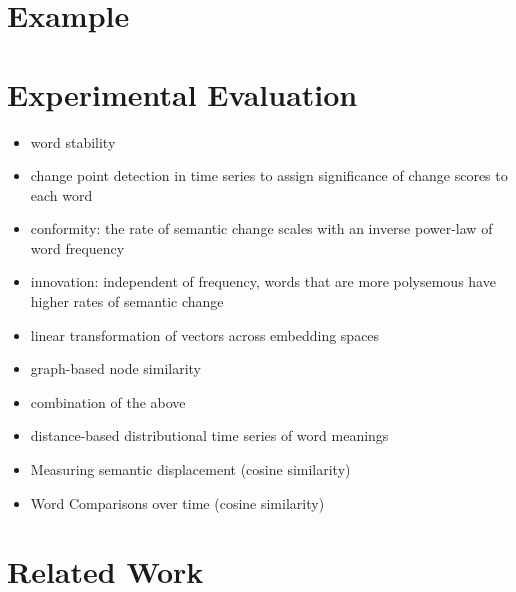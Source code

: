 \documentclass{article}
\begin{document}
\section{Example}
\section{Experimental Evaluation}
\begin{itemize}
    \item word stability~\cite{azarbonyadWordsAreMalleable2017}
    \item change point detection in time series to assign significance of change scores to each word~\cite{kulkarniStatisticallySignificantDetection2015}
    \item conformity: the rate of semantic change scales with an inverse power-law of word frequency~\cite{hamiltonDiachronicWordEmbeddings2016}
    \item innovation: independent of frequency, words that are more polysemous have higher rates of semantic change~\cite{hamiltonDiachronicWordEmbeddings2016}
\end{itemize}
\begin{itemize}
    \item linear transformation of vectors across embedding spaces~\cite{azarbonyadWordsAreMalleable2017}
    \item graph-based node similarity\cite{azarbonyadWordsAreMalleable2017}
    \item combination of the above~\cite{azarbonyadWordsAreMalleable2017}
    \item distance-based distributional time series of word meanings~\cite{kulkarniStatisticallySignificantDetection2015}
    \item Measuring semantic displacement (cosine similarity)~\cite{hamiltonDiachronicWordEmbeddings2016}
    \item Word Comparisons over time (cosine similarity)~\cite{kimTemporalAnalysisLanguage2014}
\end{itemize}

\section{Related Work}
\end{document}
